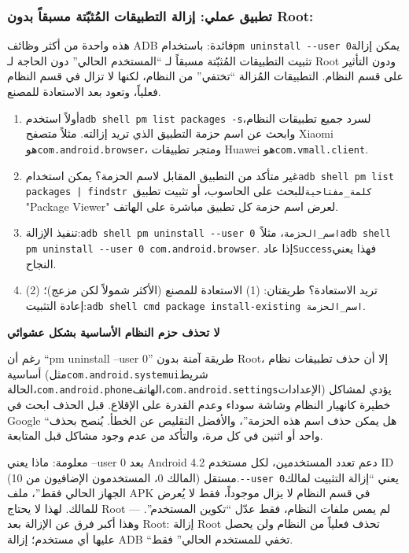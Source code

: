 \subsubsection*{تطبيق عملي: إزالة التطبيقات المُثبّتة مسبقاً بدون Root:}

هذه واحدة من أكثر وظائف ADB فائدة: باستخدام\texttt{pm uninstall -\allowbreak -\allowbreak user 0}يمكن إزالة تثبيت التطبيقات المُثبّتة مسبقاً لـ “المستخدم الحالي” دون الحاجة لـ Root ودون التأثير على قسم النظام. التطبيقات المُزالة “تختفي” من النظام، لكنها لا تزال في قسم النظام فعلياً، وتعود بعد الاستعادة للمصنع.

\begin{enumerate}
  \item أولاً استخدم\texttt{adb shell pm list packages -\allowbreak s}لسرد جميع تطبيقات النظام، وابحث عن اسم حزمة التطبيق الذي تريد إزالته. مثلاً متصفح Xiaomi هو\texttt{com.\allowbreak android.\allowbreak browser}، ومتجر تطبيقات Huawei هو\texttt{com.\allowbreak vmall.\allowbreak client}.
  \item غير متأكد من التطبيق المقابل لاسم الحزمة؟ يمكن استخدام\texttt{adb shell pm list packages | findstr كلمة\_مفتاحية}للبحث على الحاسوب، أو تثبيت تطبيق "Package Viewer" لعرض اسم حزمة كل تطبيق مباشرة على الهاتف.
  \item تنفيذ الإزالة:\texttt{adb shell pm uninstall -\allowbreak -\allowbreak user 0 اسم\_الحزمة}، مثلاً\texttt{adb shell pm uninstall -\allowbreak -\allowbreak user 0 com.\allowbreak android.\allowbreak browser}. إذا عاد\texttt{Success}فهذا يعني النجاح.
  \item تريد الاستعادة؟ طريقتان: (1) الاستعادة للمصنع (الأكثر شمولاً لكن مزعج)؛ (2) إعادة التثبيت:\texttt{adb shell cmd package install-\allowbreak existing اسم\_الحزمة}.
\end{enumerate}

\textbf{لا تحذف حزم النظام الأساسية بشكل عشوائي}\par

رغم أن “pm uninstall --user 0” طريقة آمنة بدون Root، إلا أن حذف تطبيقات نظام أساسية (مثل\texttt{com.\allowbreak android.\allowbreak systemui}شريط الحالة،\texttt{com.\allowbreak android.\allowbreak phone}الهاتف،\texttt{com.\allowbreak android.\allowbreak settings}الإعدادات) يؤدي لمشاكل خطيرة كانهيار النظام وشاشة سوداء وعدم القدرة على الإقلاع. قبل الحذف ابحث في Google “هل يمكن حذف اسم هذه الحزمة”، والأفضل التقليص عن الخطأ. يُنصح بحذف واحد أو اثنين في كل مرة، والتأكد من عدم وجود مشاكل قبل المتابعة.

\begin{tcbinfo}{معلومة: ماذا يعني --user 0}
بعد Android 4.2 دعم تعدد المستخدمين، لكل مستخدم ID مستقل (المالك 0، المستخدمون الإضافيون من 10).\texttt{-\allowbreak -\allowbreak user 0}يعني “إزالة التثبيت لمالك الجهاز الحالي فقط”، ملف APK في قسم النظام لا يزال موجوداً، فقط لا يُعرض للمالك. لهذا لا يحتاج Root — لم يمس ملفات النظام، فقط عدّل “تكوين المستخدم”. وهذا أكبر فرق عن الإزالة بعد Root: إزالة Root تحذف فعلياً من النظام ولن يحصل عليها أي مستخدم؛ إزالة ADB “تخفي للمستخدم الحالي” فقط.

\end{tcbinfo}

